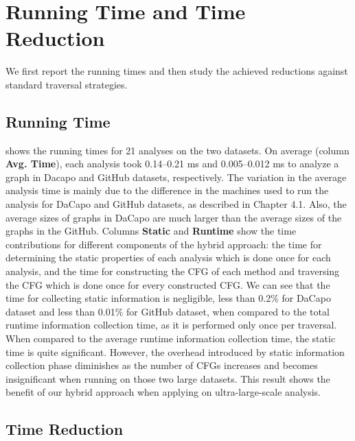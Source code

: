 \section{Running Time and Time Reduction}
\label{sec:performance-gain}

We first report the running times and then study the achieved reductions against standard traversal strategies. 

\subsection{Running Time}

 shows the running times for 21 analyses on the two 
datasets. On average (column \textbf{Avg. Time}), each analysis took 
0.14--0.21 ms and 0.005--0.012 ms to analyze a graph in Dacapo and GitHub 
datasets, respectively. The variation in the average analysis time is 
mainly due to the difference in the machines used to run the analysis for 
DaCapo and GitHub datasets, as described in Chapter 4.1. Also, the average 
sizes of graphs in DaCapo are much larger than the average sizes of the graphs in the GitHub.
%
Columns \textbf{Static} and \textbf{Runtime} show the time contributions for 
different components of the hybrid approach: the time for determining the 
static properties of each analysis which is done once for each analysis, and 
the time for constructing the CFG of each method and traversing the CFG which 
is done once for every constructed CFG. 
We can see that the time for collecting static information is negligible, 
less than 0.2\% for DaCapo dataset and less than 0.01\% for GitHub 
dataset, when compared to the total runtime information collection time, as it is performed only 
once per traversal. When compared to the average runtime information collection time, the static 
time is quite significant. However, the overhead introduced by static 
information collection phase diminishes as the number of CFGs increases and 
becomes insignificant when running on those two large datasets. This result 
shows the benefit of our hybrid approach when applying on ultra-large-scale
analysis.

\subsection{Time Reduction}

